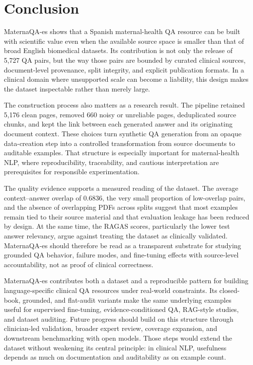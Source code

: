 \documentclass[conference]{IEEEtran}
\begin{document}
\section{Conclusion}
MaternaQA-es shows that a Spanish maternal-health QA resource can be built with scientific value even when the available source space is smaller than that of broad English biomedical datasets. Its contribution is not only the release of 5,727 QA pairs, but the way those pairs are bounded by curated clinical sources, document-level provenance, split integrity, and explicit publication formats. In a clinical domain where unsupported scale can become a liability, this design makes the dataset inspectable rather than merely large.

The construction process also matters as a research result. The pipeline retained 5,176 clean pages, removed 660 noisy or unreliable pages, deduplicated source chunks, and kept the link between each generated answer and its originating document context. These choices turn synthetic QA generation from an opaque data-creation step into a controlled transformation from source documents to auditable examples. That structure is especially important for maternal-health NLP, where reproducibility, traceability, and cautious interpretation are prerequisites for responsible experimentation.

The quality evidence supports a measured reading of the dataset. The average context--answer overlap of 0.6836, the very small proportion of low-overlap pairs, and the absence of overlapping PDFs across splits suggest that most examples remain tied to their source material and that evaluation leakage has been reduced by design. At the same time, the RAGAS scores, particularly the lower test answer relevancy, argue against treating the dataset as clinically validated. MaternaQA-es should therefore be read as a transparent substrate for studying grounded QA behavior, failure modes, and fine-tuning effects with source-level accountability, not as proof of clinical correctness.

MaternaQA-es contributes both a dataset and a reproducible pattern for building language-specific clinical QA resources under real-world constraints. Its closed-book, grounded, and flat-audit variants make the same underlying examples useful for supervised fine-tuning, evidence-conditioned QA, RAG-style studies, and dataset auditing. Future progress should build on this structure through clinician-led validation, broader expert review, coverage expansion, and downstream benchmarking with open models. Those steps would extend the dataset without weakening its central principle: in clinical NLP, usefulness depends as much on documentation and auditability as on example count.
\end{document}
